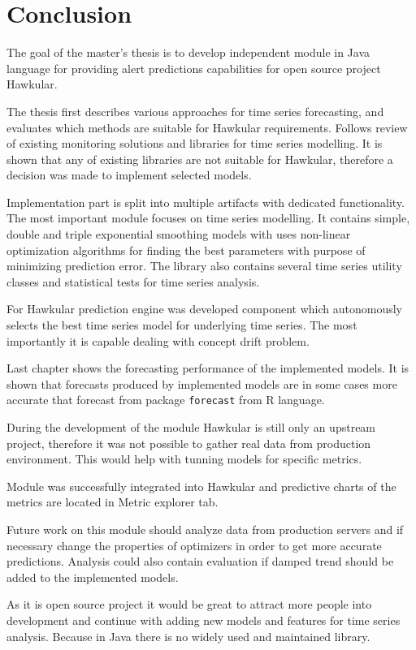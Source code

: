 \chapter{Conclusion} \label{chap:conclusion}
The goal of the master's thesis is to develop independent module in Java language for providing alert predictions
capabilities for open source project Hawkular.

The thesis first describes various approaches for time series forecasting, and evaluates which methods are suitable
for Hawkular requirements. Follows review of existing monitoring solutions and libraries for time series modelling.
It is shown that any of existing libraries are not suitable for Hawkular, therefore a decision was made to implement
selected models.

Implementation part is split into multiple artifacts with dedicated functionality. The most important module
focuses on time series modelling. It contains simple, double and triple exponential smoothing models with
uses non-linear optimization algorithms for finding the best parameters with purpose of minimizing prediction error.
The library also contains several time series utility classes and statistical tests for time series analysis.

For Hawkular prediction engine was developed component which autonomously selects the best time series model for
underlying time series. The most importantly it is capable dealing with concept drift problem.

Last chapter shows the forecasting performance of the implemented models. It is shown that forecasts produced by
implemented models are in some cases more accurate that forecast from package \texttt{forecast} from R language.

During the development of the module Hawkular is still only an upstream project, therefore it was not possible to
gather real data from production environment. This would help with tunning models for specific metrics.

Module was successfully integrated into Hawkular and predictive charts of the metrics are located in Metric explorer tab.

Future work on this module should analyze data from production servers and if necessary change the properties of
optimizers in order to get more accurate predictions. Analysis could also contain evaluation if damped trend should be
added to the implemented models.

As it is open source project it would be great to attract more people into development and continue with adding new
models and features for time series analysis. Because in Java there is no widely used and maintained library.

